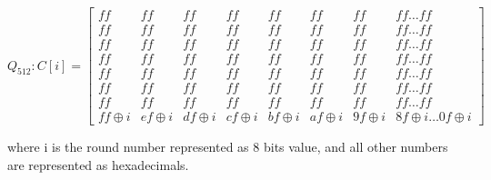 \begin{itemize}
    $Q_{512}: C[i] = \begin{bmatrix}
      ff     & ff     & ff     & ff     & ff     & ff     & ff     & ff     \dots ff    \\
      ff     & ff     & ff     & ff     & ff     & ff     & ff     & ff     \dots ff    \\
      ff     & ff     & ff     & ff     & ff     & ff     & ff     & ff     \dots ff    \\
      ff     & ff     & ff     & ff     & ff     & ff     & ff     & ff     \dots ff    \\
      ff     & ff     & ff     & ff     & ff     & ff     & ff     & ff     \dots ff    \\
      ff     & ff     & ff     & ff     & ff     & ff     & ff     & ff     \dots ff    \\
      ff     & ff     & ff     & ff     & ff     & ff     & ff     & ff     \dots ff    \\
      ff \oplus i & ef \oplus i & df \oplus i & cf \oplus i & bf \oplus i & af \oplus i & 9f \oplus i & 8f \oplus i \dots 0f \oplus i
    \end{bmatrix}$

    where i is the round number represented as 8 bits value, and all other numbers are represented as
    hexadecimals.
    

\end{itemize}
